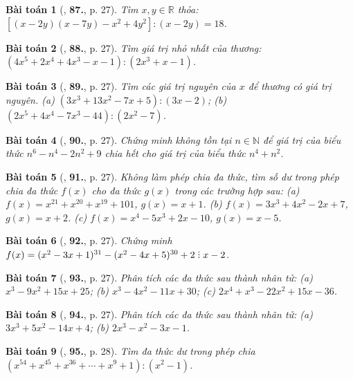 \documentclass{article}
\numberwithin{equation}{section}
\newtheorem{baitoan}{Bài toán}
\DeclareRobustCommand{\divby}{%
	\mathrel{\vbox{\baselineskip.65ex\lineskiplimit0pt\hbox{.}\hbox{.}\hbox{.}}}%
}
\begin{document}
\begin{baitoan}[\cite{Tuyen_Toan_8}, \textbf{87.}, p. 27]
	Tìm $x,y\in\mathbb{R}$ thỏa: $[(x - 2y)(x - 7y) - x^2 + 4y^2]:(x - 2y) = 18$.
\end{baitoan}

\begin{baitoan}[\cite{Tuyen_Toan_8}, \textbf{88.}, p. 27]
	Tìm giá trị nhỏ nhất của thương: $(4x^5 + 2x^4 + 4x^3 - x - 1):(2x^3 + x - 1)$.
\end{baitoan}

\begin{baitoan}[\cite{Tuyen_Toan_8}, \textbf{89.}, p. 27]
	Tìm các giá trị nguyên của $x$ để thương có giá trị nguyên. (a) $(3x^3 + 13x^2 - 7x + 5):(3x - 2)$; (b) $(2x^5 + 4x^4 - 7x^3 - 44):(2x^2 - 7)$.
\end{baitoan}

\begin{baitoan}[\cite{Tuyen_Toan_8}, \textbf{90.}, p. 27]
	Chứng minh không tồn tại $n\in\mathbb{N}$ để giá trị của biểu thức $n^6 - n^4 - 2n^2 + 9$ chia hết cho giá trị của biểu thức $n^4 + n^2$.
\end{baitoan}

\begin{baitoan}[\cite{Tuyen_Toan_8}, \textbf{91.}, p. 27]
	Không làm phép chia đa thức, tìm số dư trong phép chia đa thức $f(x)$ cho đa thức $g(x)$ trong các trường hợp sau: (a) $f(x) = x^{21} + x^{20} + x^{19}  + 101$, $g(x) = x + 1$. (b) $f(x) = 3x^3 + 4x^2 - 2x + 7$, $g(x) = x + 2$. (c) $f(x) = x^4 - 5x^3 + 2x - 10$, $g(x) = x - 5$.
\end{baitoan}

\begin{baitoan}[\cite{Tuyen_Toan_8}, \textbf{92.}, p. 27]
	Chứng minh $f(x) = (x^2 - 3x + 1)^{31} - (x^2 - 4x + 5)^{30} + 2\divby x - 2$.
\end{baitoan}

\begin{baitoan}[\cite{Tuyen_Toan_8}, \textbf{93.}, p. 27]
	Phân tích các đa thức sau thành nhân tử: (a) $x^3 - 9x^2 + 15x + 25$; (b) $x^3 - 4x^2 - 11x + 30$; (c) $2x^4 + x^3 - 22x^2 + 15x - 36$.
\end{baitoan}

\begin{baitoan}[\cite{Tuyen_Toan_8}, \textbf{94.}, p. 27]
	Phân tích các đa thức sau thành nhân tử: (a) $3x^3 + 5x^2 - 14x + 4$; (b) $2x^3 - x^2 - 3x - 1$.
\end{baitoan}

\begin{baitoan}[\cite{Tuyen_Toan_8}, \textbf{95.}, p. 28]
	Tìm đa thức dư trong phép chia $(x^{54} + x^{45} + x^{36} + \cdots + x^9 + 1):(x^2 - 1)$.
\end{baitoan}
\end{document}
